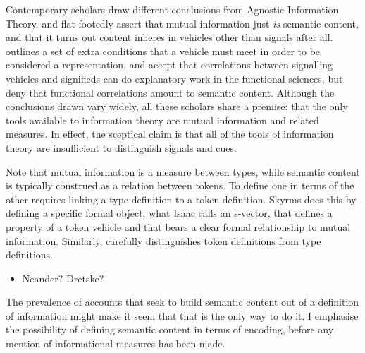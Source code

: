 Contemporary scholars draw different conclusions from {\sc Agnostic Information Theory}.
\citet{skyrms2010signals} and \citet{isaac2018semantics} flat-footedly assert that mutual information just \textit{is} semantic content, and that it turns out content inheres in vehicles other than signals after all.
\citet[SECTION]{shea2018representation} outlines a set of extra conditions that a vehicle must meet in order to be considered a representation. 
\citet{lean2014shannon} and \citet[CHAPTER]{hutto2017evolving} accept that correlations between signalling vehicles and signifieds can do explanatory work in the functional sciences, but deny that functional correlations amount to semantic content.
Although the conclusions drawn vary widely, all these scholars share a premise: that the only tools available to information theory are mutual information and related measures.
In effect, the sceptical claim is that all of the tools of information theory are insufficient to distinguish signals and cues.

Note that mutual information is a measure between types, while semantic content is typically construed as a relation between tokens.
To define one in terms of the other requires linking a type definition to a token definition.
Skyrms does this by defining a specific formal object, what Isaac calls an s-vector, that defines a property of a token vehicle and that bears a clear formal relationship to mutual information.
Similarly, \citet[$\S$4]{shea2018representation} carefully distinguishes token definitions from type definitions.

\begin{itemize}
    \item Neander? Dretske?
\end{itemize}

The prevalence of accounts that seek to build semantic content out of a definition of information might make it seem that that is the only way to do it.
I emphasise the possibility of defining semantic content in terms of encoding, before any mention of informational measures has been made.


